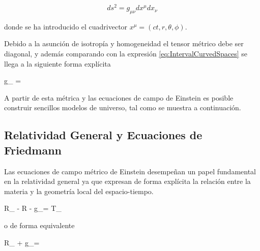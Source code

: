 \[ ds^2 = g_{\mu \nu}dx^\mu dx_\nu \]


donde se ha introducido el cuadrivector $x^\mu = (ct, r, \theta, \phi)$.


Debido a la asunción de isotropía y homogeneidad el tensor métrico debe ser
diagonal, y además comparando con la expresión \ref{eq:IntervalCurvedSpaces}
se llega a la siguiente forma explícita


{g_{\mu \nu} = }


A partir de esta métrica y las ecuaciones de campo de Einstein es posible 
construir sencillos modelos de universo, tal como se muestra a continuación.


	\subsection{Relatividad General y Ecuaciones de Friedmann}
	\label{subsec:GeneralRelativityAndFriedmannEquations}
	

Las ecuaciones de campo métrico de Einstein desempeñan un papel fundamental
en la relatividad general ya que expresan de forma explícita la relación entre
la materia y la geometría local del espacio-tiempo.


{ R_{\mu \nu} - R - g_{\mu \nu}\Lambda = 
T_{\mu \nu} }


o de forma equivalente 


{ R_{\mu \nu} + g_{\mu \nu}\Lambda = 
 }


